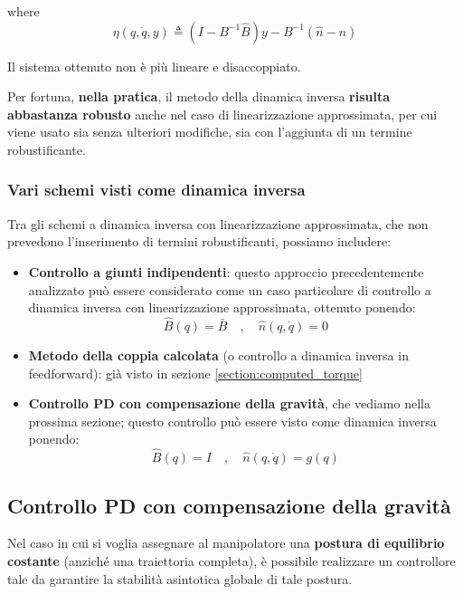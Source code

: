 where
$$
\eta(q, \dot{q}, y) \triangleq (I - B^{-1}\hat{B})y - B^{-1}(\hat{n} - n)
$$

Il sistema ottenuto non è più lineare e disaccoppiato.

Per fortuna, \textbf{nella pratica}, il metodo della dinamica inversa \textbf{risulta abbastanza robusto} anche nel caso di linearizzazione approssimata, per cui viene usato sia senza ulteriori modifiche, sia con l’aggiunta di un termine robustificante.\\

\vspace*{10pt}
\subsubsection{Vari schemi visti come dinamica inversa}
Tra gli schemi a dinamica inversa con linearizzazione approssimata, che non prevedono l’inserimento di termini robustificanti, possiamo includere:
\begin{itemize}
	\item \textbf{Controllo a giunti indipendenti}: questo approccio precedentemente analizzato può essere considerato come un caso particolare di controllo a dinamica inversa con linearizzazione approssimata, ottenuto ponendo:
	$$
	\hat{B}(q) = \bar{B} \quad , \quad \hat{n}(q, \dot{q}) = 0
	$$
	\item \textbf{Metodo della coppia calcolata} (o controllo a dinamica inversa in feedforward): già visto in sezione \ref{section:computed_torque}
	\item \textbf{Controllo PD con compensazione della gravità}, che vediamo nella prossima sezione; questo controllo può essere visto come dinamica inversa ponendo:
	$$
	\hat{B}(q) = I \quad , \quad \hat{n}(q, \dot{q}) = g(q)
	$$
\end{itemize}
\unboldmath









\subsection{Controllo PD con compensazione della gravità}

Nel caso in cui si voglia assegnare al manipolatore una \textbf{postura di equilibrio costante} (anziché una traiettoria completa), è possibile realizzare un controllore tale da garantire la stabilità asintotica globale di tale postura.

